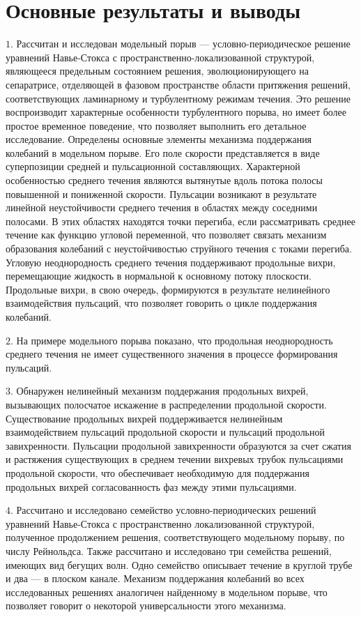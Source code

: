 
\section*{\centering Основные результаты и выводы}

\noindent $1.$ Рассчитан и исследован модельный порыв --- условно-периодическое решение уравнений Навье-Стокса с пространственно-локализованной структурой, являющееся предельным состоянием решения, эволюционирующего на сепаратрисе, отделяющей в фазовом пространстве области притяжения решений, соответствующих ламинарному и турбулентному режимам течения. Это решение воспроизводит характерные особенности турбулентного порыва, но имеет более простое временное поведение, что позволяет выполнить его детальное исследование. Определены основные элементы механизма поддержания колебаний в модельном порыве. Его поле скорости представляется в виде суперпозиции средней и пульсационной составляющих. Характерной особенностью среднего течения являются вытянутые вдоль потока полосы повышенной и пониженной скорости. Пульсации возникают в результате линейной неустойчивости среднего течения в областях между соседними полосами. В этих областях находятся точки перегиба, если рассматривать среднее течение как функцию угловой переменной, что позволяет связать механизм образования колебаний с неустойчивостью струйного течения с токами перегиба. Угловую неоднородность среднего течения поддерживают продольные вихри, перемещающие жидкость в нормальной к основному потоку плоскости. Продольные вихри, в свою очередь, формируются в результате нелинейного взаимодействия пульсаций, что позволяет говорить о цикле поддержания колебаний. 

\noindent $2.$ На примере модельного порыва показано, что продольная неоднородность среднего течения не имеет существенного значения в процессе формирования пульсаций. 

\noindent $3.$ Обнаружен нелинейный механизм поддержания продольных вихрей, вызывающих полосчатое искажение в распределении продольной скорости. Существование продольных вихрей поддерживается нелинейным взаимодействием пульсаций продольной скорости и пульсаций продольной завихренности. Пульсации продольной завихренности образуются за счет сжатия и растяжения существующих в среднем течении вихревых трубок пульсациями продольной скорости, что обеспечивает необходимую для поддержания продольных вихрей согласованность фаз между этими пульсациями. 

\noindent $4.$ Рассчитано и исследовано семейство условно-периодических решений уравнений Навье-Стокса с пространственно локализованной структурой, полученное продолжением решения, соответствующего модельному порыву, по числу Рейнольдса. Также рассчитано и исследовано три семейства решений, имеющих вид бегущих волн. Одно семейство описывает течение в круглой трубе и два --- в плоском канале. Механизм поддержания колебаний во всех исследованных решениях аналогичен найденному в модельном порыве, что позволяет говорит о некоторой универсальности этого механизма. 
